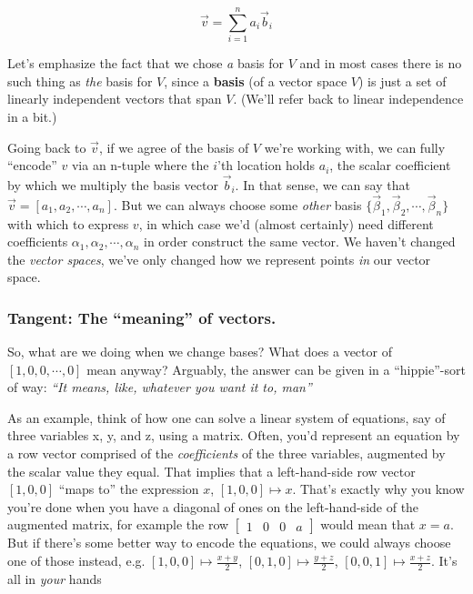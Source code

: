 \documentclass[letterpaper,12pt]{report}
\begin{document}
\[\vec{v} = \sum_{i=1}^{n} a_i\vec{b}_i \]



Let's emphasize the fact that we chose \emph{a} basis for \(V\)
and in most cases there is no such thing as \emph{the} basis for \(V\), since a
\textbf{basis} (of a vector space \(V\))
is just a set of linearly independent vectors that span \(V\).
(We'll refer back to linear independence in a bit.)\par

Going back to \(\vec{v}\), if we agree of the basis of \(V\) we're working with,
we can fully ``encode'' \(v\) via an n-tuple where the \(i\)'th location holds \(a_i\),
the scalar coefficient by which we multiply the basis vector \(\vec{b}_i\).
In that sense, we can say that \(\vec{v} = \left[a_1, a_2, \cdots, a_n\right]\).
But we can always choose some \emph{other} basis
\(\{\vec{\beta}_1, \vec{\beta}_2, \cdots, \vec{\beta}_n\}\)
with which to express \(v\), in which case we'd (almost certainly) need different coefficients
\(\alpha_1, \alpha_2, \cdots, \alpha_n\) in order construct the same vector.
We haven't changed the \emph{vector spaces}, we've only changed how we represent points
\emph{in} our vector space.\par

\subsubsection*{Tangent: The ``meaning'' of vectors.}

So, what are we doing when we change bases? What does a vector of
\(\left[1, 0, 0, \cdots, 0\right]\) mean anyway?
Arguably, the answer can be given in a ``hippie''-sort of way:
\textit{``It means, like, whatever you want it to, man\texttildelow''}\par

As an example, think of how one can solve a linear system of equations,
say of three variables x, y, and z,
using a matrix.
Often, you'd represent an equation by a row vector comprised of
the \emph{coefficients} of the three variables,
augmented by the scalar value they equal. That implies that
a left-hand-side row vector \([1, 0, 0]\) ``maps to'' the expression \(x\),
\([1,0,0] \mapsto x\). That's exactly why you know you're done when you have a 
diagonal of ones on the left-hand-side of the augmented matrix, for example the row
\(
\left[
\begin{array}{ccc|c}
1 & 0 & 0 & a
\end{array}
\right]
\)
would mean that \(x=a\).
But if there's some better way to encode the equations, we could always choose
one of those instead, e.g.
\([1,0,0] \mapsto \frac{x+y}{2}\), 
\([0,1,0] \mapsto \frac{y+z}{2}\),
\([0,0,1] \mapsto \frac{x+z}{2}\).
It's all in \emph{your} hands \texttildelow\par
\end{document}
